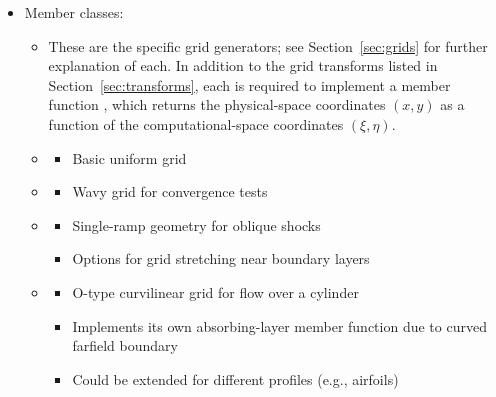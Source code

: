 \documentclass[letterpaper,10pt]{article}
\begin{document}
\begin{enumerate}
\begin{itemize}
\begin{itemize}
    \item {}
      \begin{itemize}
      \item sdf
      \end{itemize}
      
    \end{itemize}

  \item \textcolor{lc2}{Member classes:}
    \begin{itemize}
    \item These are the specific grid generators; see Section~\ref{sec:grids} for further explanation of each. In addition to the grid transforms listed in Section~\ref{sec:transforms}, each is required to implement a member function , which returns the physical-space coordinates $(x,y)$ as a function of the computational-space coordinates $(\xi,\eta)$.

    \item {}
      \begin{itemize}
      \item Basic uniform grid
      \end{itemize}

    \item {}
      \begin{itemize}
      \item Wavy grid for convergence tests
      \end{itemize}

    \item {}
      \begin{itemize}
      \item Single-ramp geometry for oblique shocks
      \item Options for grid stretching near boundary layers
      \end{itemize}

    \item {}
      \begin{itemize}
      \item O-type curvilinear grid for flow over a cylinder
      \item Implements its own absorbing-layer member function due to curved farfield boundary
      \item Could be extended for different profiles (e.g., airfoils)
      \end{itemize}
      

\end{itemize}
\end{itemize}
\end{enumerate}
\end{document}
